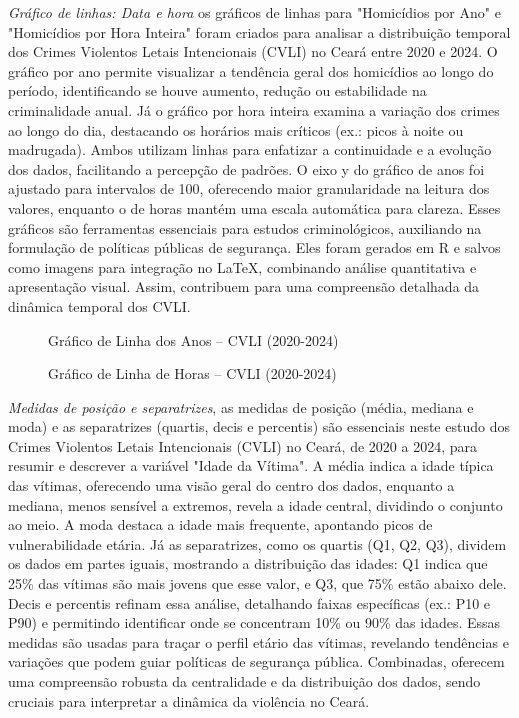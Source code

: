 \documentclass{exam}
\begin{document}
\begin{questions}
\question 
\textit{Gráfico de linhas: Data e hora} os gráficos de linhas para "Homicídios por Ano" e "Homicídios por Hora Inteira" foram criados para analisar a distribuição temporal dos Crimes Violentos Letais Intencionais (CVLI) no Ceará entre 2020 e 2024. O gráfico por ano permite visualizar a tendência geral dos homicídios ao longo do período, identificando se houve aumento, redução ou estabilidade na criminalidade anual. Já o gráfico por hora inteira examina a variação dos crimes ao longo do dia, destacando os horários mais críticos (ex.: picos à noite ou madrugada). Ambos utilizam linhas para enfatizar a continuidade e a evolução dos dados, facilitando a percepção de padrões. O eixo y do gráfico de anos foi ajustado para intervalos de 100, oferecendo maior granularidade na leitura dos valores, enquanto o de horas mantém uma escala automática para clareza. Esses gráficos são ferramentas essenciais para estudos criminológicos, auxiliando na formulação de políticas públicas de segurança. Eles foram gerados em R e salvos como imagens para integração no LaTeX, combinando análise quantitativa e apresentação visual. Assim, contribuem para uma compreensão detalhada da dinâmica temporal dos CVLI.

\begin{figure}[H]
    \centering
    
    \caption{Gráfico de Linha dos Anos -- CVLI (2020-2024)}
    \label{fig:grafico_de_ano}
\end{figure}

\begin{figure}[H]
    \centering
    
    \caption{Gráfico de Linha de Horas -- CVLI (2020-2024)}
    \label{fig:grafico_dia_semana}
\end{figure}

\question 
\textit{Medidas de posição e separatrizes}, as medidas de posição (média, mediana e moda) e as separatrizes (quartis, decis e percentis) são essenciais neste estudo dos Crimes Violentos Letais Intencionais (CVLI) no Ceará, de 2020 a 2024, para resumir e descrever a variável "Idade da Vítima". A média indica a idade típica das vítimas, oferecendo uma visão geral do centro dos dados, enquanto a mediana, menos sensível a extremos, revela a idade central, dividindo o conjunto ao meio. A moda destaca a idade mais frequente, apontando picos de vulnerabilidade etária. Já as separatrizes, como os quartis (Q1, Q2, Q3), dividem os dados em partes iguais, mostrando a distribuição das idades: Q1 indica que 25\% das vítimas são mais jovens que esse valor, e Q3, que 75\% estão abaixo dele. Decis e percentis refinam essa análise, detalhando faixas específicas (ex.: P10 e P90) e permitindo identificar onde se concentram 10\% ou 90\% das idades. Essas medidas são usadas para traçar o perfil etário das vítimas, revelando tendências e variações que podem guiar políticas de segurança pública. Combinadas, oferecem uma compreensão robusta da centralidade e da distribuição dos dados, sendo cruciais para interpretar a dinâmica da violência no Ceará.


\end{questions}
\end{document}
